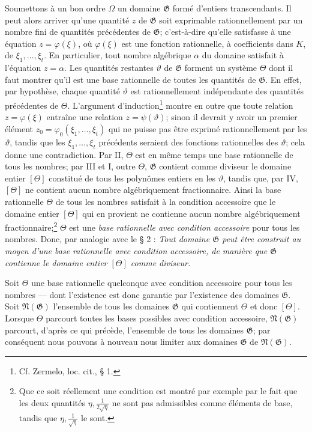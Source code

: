 Soumettons à un bon ordre $\Omega$ un domaine $\mathfrak G$ formé d'entiers transcendants. Il peut alors arriver qu'une quantité $z$ de $\mathfrak G$ soit exprimable rationnellement par un nombre fini de quantités précédentes de $\mathfrak G$; c'est-à-dire qu'elle satisfasse à une équation $z=\varphi(\xi)$, où $\varphi(\xi)$ est une fonction rationnelle, à coefficients dans $K$, de $\xi_1,\ldots,\xi_t$. En particulier, tout nombre algébrique $\alpha$ du domaine satisfait à l'équation $z=\alpha$. Les quantités restantes $\vartheta$ de $\mathfrak G$ forment un système $\Theta$ dont il faut montrer qu'il est une base rationnelle de toutes les quantités de $\mathfrak G$. En effet, par hypothèse, chaque quantité $\vartheta$ est rationnellement indépendante des quantités précédentes de $\Theta$. L'argument d'induction\footnote{Cf. Zermelo, loc. cit., \S{} 1.} montre en outre que toute relation $z=\varphi(\xi)$ entraîne une relation $z=\psi(\vartheta)$; sinon il devrait y avoir un premier élément $z_0=\varphi_0(\xi_1,\ldots,\xi_t)$ qui ne puisse pas être exprimé rationnellement par les $\vartheta$, tandis que les $\xi_1,\ldots,\xi_t$ précédents seraient des fonctions rationnelles des $\vartheta$; cela donne une contradiction. Par II, $\Theta$ est en même temps une base rationnelle de tous les nombres; par III et I, outre $\Theta$, $\mathfrak G$ contient comme diviseur le domaine entier $[\Theta]$ constitué de tous les polynômes entiers en les $\vartheta$, tandis que, par IV, $[\Theta]$ ne contient aucun nombre algébriquement fractionnaire. Ainsi la base rationnelle $\Theta$ de tous les nombres satisfait à la condition accessoire que le domaine entier $[\Theta]$ qui en provient ne contienne aucun nombre algébriquement fractionnaire;\footnote{Que ce soit réellement une condition est montré par exemple par le fait que les deux quantités $\eta,\frac1{2\sqrt{\eta}}$ ne sont pas admissibles comme éléments de base, tandis que $\eta,\frac1{\sqrt{\eta}}$ le sont.} $\Theta$ est une \emph{base rationnelle avec condition accessoire} pour tous les nombres. Donc, par analogie avec le \S{} 2 : \emph{Tout domaine $\mathfrak G$ peut être construit au moyen d'une base rationnelle avec condition accessoire, de manière que $\mathfrak G$ contienne le domaine entier $[\Theta]$ comme diviseur.}

Soit $\Theta$ une base rationnelle quelconque avec condition accessoire pour tous les nombres --- dont l'existence est donc garantie par l'existence des domaines $\mathfrak G$. Soit $\mathfrak N(\mathfrak G)$ l'ensemble de tous les domaines $\mathfrak G$ qui contiennent $\Theta$ et donc $[\Theta]$. Lorsque $\Theta$ parcourt toutes les bases possibles avec condition accessoire, $\mathfrak N(\mathfrak G)$ parcourt, d'après ce qui précède, l'ensemble de tous les domaines $\mathfrak G$; par conséquent nous pouvons à nouveau nous limiter aux domaines $\mathfrak G$ de $\mathfrak N(\mathfrak G)$.

